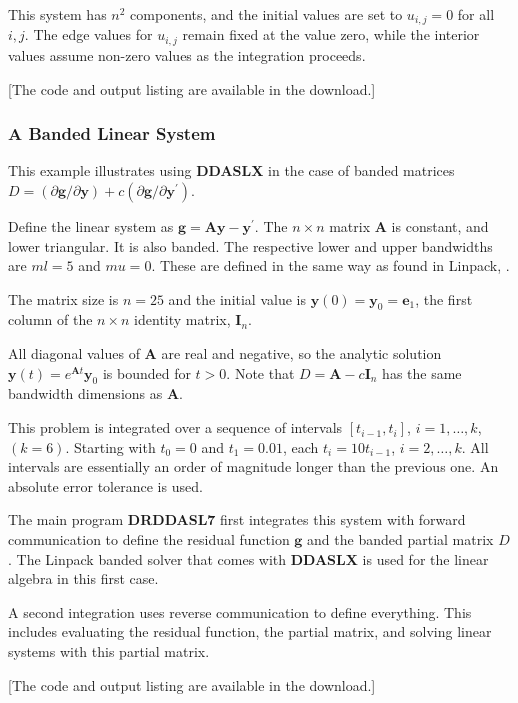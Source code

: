 \documentclass[twoside]{MATH77}
\begin{document}
This system has $n^2$ components, and the initial values are set to
$u_{i,j}=0$ for all $i,j$.  The edge values for $u_{i,j}$ remain fixed at the
value zero, while the interior values assume non-zero values as the integration
proceeds.

[The code and output listing are available in the download.]

\subsubsection{A Banded Linear System}
This example illustrates using \textbf{DDASLX} in the case of banded
matrices $D=(\partial \mathbf{g}/\partial \mathbf{y})+c
(\partial \mathbf{g}/\partial \mathbf{y}^{\prime})$.

Define the linear system as $\mathbf{g}=
\mathbf{A}\mathbf{y}-\mathbf{y}^{\prime}$. The $n \times n$ matrix $\mathbf{A}$
is constant, and lower triangular.  It is also banded. The respective
lower and upper
bandwidths are $ml=5$ and $mu=0$.  These are defined in the same way as
found in  Linpack, \cite{Dongarra:1979:LUG}.

The matrix size is $n=25$ and the initial value
is  $\mathbf{y}(0)=\mathbf{y}_{0}=\mathbf{e}_{1}$, the first column of
the $n \times n$ identity matrix, $\mathbf{I}_{n}$.

All diagonal values of $\mathbf{A}$ are real and negative, so the analytic
solution
$\mathbf{y}(t)=e^{\mathbf{A}t}\mathbf{y}_0$ is bounded for $t>0$. Note that
$D=\mathbf{A}-c\mathbf{I}_{n}$ has the same bandwidth dimensions as $\mathbf{A}$.

This problem is integrated over a sequence of intervals $[t_{i-1},t_{i}]$,
$i=1,\ldots,k$, $(k=6)$.  Starting with $t_0=0$ and $t_1=0.01$, each $t_i=10t_{i-1}$,
$i=2,\ldots,k$.  All  intervals are essentially an order of magnitude
longer than the previous one.  An absolute error tolerance is used.

The main program \textbf{DRDDASL7} first integrates this system with forward communication
to define the residual function $\mathbf{g}$ and the banded partial matrix $D$.
The Linpack banded solver that comes with  \textbf{DDASLX} is used for the linear algebra
in this first case.

A second integration  uses reverse communication to define everything.
This includes evaluating the residual function,
the partial matrix, and  solving linear
systems with this partial matrix.

[The code and output listing are available in the download.]
\end{document}

